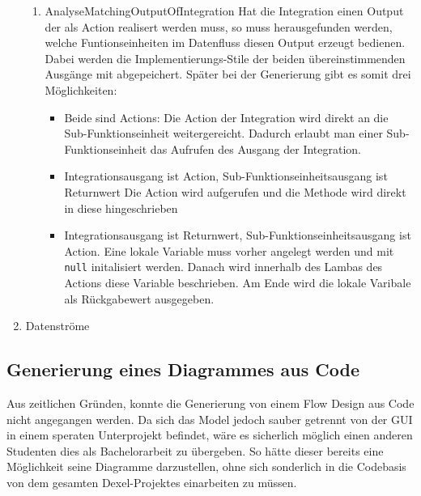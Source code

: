 \begin{enumerate}
\begin{enumerate}
		\item AnalyseMatchingOutputOfIntegration
		\label{sec:orgheadline48}
		Hat die Integration einen Output der als Action realisert werden muss, so
		muss herausgefunden werden, welche Funtionseinheiten im Datenfluss diesen
		Output erzeugt bedienen. Dabei werden die Implementierungs-Stile der
		beiden übereinstimmenden Ausgänge mit abgepeichert. Später bei der
		Generierung gibt es somit drei Möglichkeiten:
		\begin{itemize}
			\item Beide sind Actions:
			Die Action der Integration wird direkt an die Sub-Funktionseinheit
			weitergereicht. Dadurch erlaubt man einer Sub-Funktionseinheit das
			Aufrufen des Ausgang der Integration.
			\item Integrationsausgang ist Action, Sub-Funktionseinheitsausgang ist
			Returnwert 
			Die Action wird aufgerufen und die Methode wird direkt in diese
			hingeschrieben
			\item Integrationsausgang ist Returnwert, Sub-Funktionseinheitsausgang ist
			Action.
			Eine lokale Variable muss vorher angelegt werden und mit \texttt{null}
			initalisiert werden. Danach wird innerhalb des Lambas des Actions diese
			Variable beschrieben. Am Ende wird die lokale Varibale als Rückgabewert
			ausgegeben.
		\end{itemize}
	\end{enumerate}
	
	
	
	\item Datenströme
	\label{sec:orgheadline50}
\end{enumerate}

\subsection{Generierung eines Diagrammes aus Code}
\label{sec:orgheadline53}
Aus zeitlichen Gründen, konnte die Generierung von einem Flow Design aus Code
nicht angegangen werden. 
Da sich das Model jedoch sauber getrennt von der GUI in
einem speraten Unterprojekt befindet, wäre es sicherlich möglich einen anderen
Studenten dies als Bachelorarbeit zu übergeben. So hätte dieser bereits eine
Möglichkeit seine Diagramme darzustellen, ohne sich sonderlich in die
Codebasis von dem gesamten Dexel-Projektes einarbeiten zu müssen.